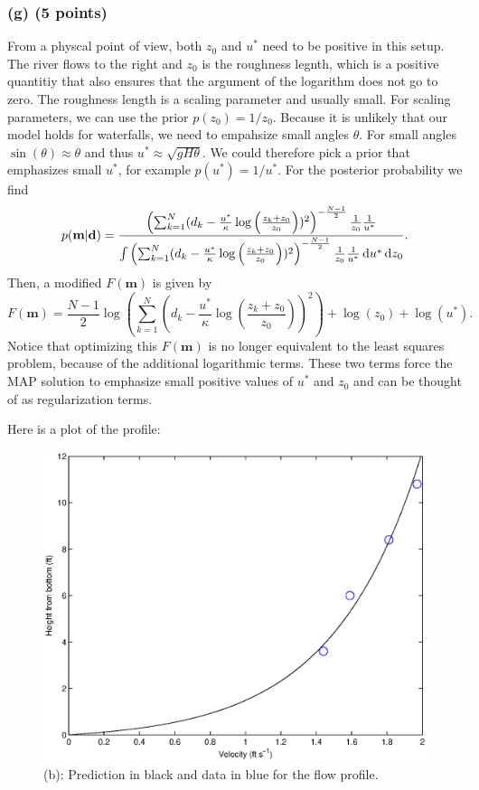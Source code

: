 \documentclass[11pt]{article}
\begin{document}
\subsubsection*{(g) (5 points)}

From a physcal point of view, both $z_0$ and $u^*$ need to be positive in this setup. The river flows to the right and $z_0$ is the roughness legnth, which is a positive quantitiy that also ensures that the argument of the logarithm does not go to zero. The roughness length is a scaling parameter and usually small. For scaling parameters, we can use the prior $p(z_0) = 1/z_0$. Because it is unlikely that our model holds for waterfalls, we need to empahsize small angles $\theta$. For small angles $\sin(\theta) \approx \theta$ and thus $u^* \approx \sqrt{gH\theta}$. We could therefore pick a prior that emphasizes small $u^*$, for example $p(u^*) = 1/u^*$. For the posterior probability we find
\begin{equation}
p(\mathbf{m}|\mathbf{d}) = \frac{\left(\sum_{k=1}^N(d_k - \frac{u^*}{\kappa} \log \left( \frac{z_k+z_0}{z_0} \right))^2\right)^{-\frac{N-1}{2}}\frac{1}{z_0}\frac{1}{u^*}}{\int \left(\sum_{k=1}^N(d_k - \frac{u^*}{\kappa} \log \left( \frac{z_k+z_0}{z_0} \right))^2\right)^{-\frac{N-1}{2}} \frac{1}{z_0}\frac{1}{u^*} \, \text{d}u^*\, \text{d}z_0}.
\end{equation}
Then, a modified $F(\mathbf{m})$ is given by
\begin{equation}
F(\mathbf{m}) = \frac{N-1}{2}\log\left( \sum_{k=1}^N(d_k - \frac{u^*}{\kappa} \log \left( \frac{z_k+z_0}{z_0} \right))^2\right) + \log(z_0) + \log(u^*).
\end{equation}
Notice that optimizing this $F(\mathbf{m})$ is no longer equivalent to the least squares problem, because of the additional logarithmic terms. These two terms force the MAP solution to  emphasize small positive values of $u^*$ and $z_0$ and can be thought of as regularization terms.

\vspace{1cm}
\noindent Here is a plot of the profile:
\begin{figure}
\begin{center}
  \includegraphics[width=12cm]{p3b.eps}
  \caption{(b): Prediction in black and data in blue for the flow profile. }
  \end{center}
\end{figure}
\end{document}
